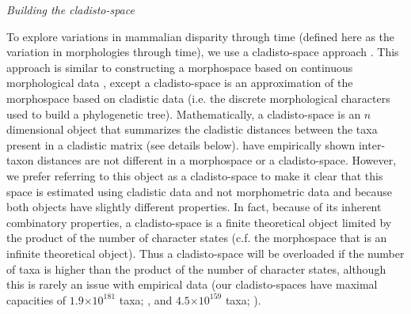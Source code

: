 \documentclass[12pt,letterpaper]{article}
\renewcommand{\subsection}[1]{%
\bigskip
\begin{center}
\begin{large}
\normalfont\itshape #1
\end{large}
\end{center}}
\begin{document}
\subsection{Building the cladisto-space}
To explore variations in mammalian disparity through time (defined here as the variation in morphologies through time), we use a cladisto-space approach \citep[e.g.][]{Foote01071994,Foote29111996,Wesley-Hunt2005,Brusatte12092008,friedmanexplosive2010,toljagictriassic-jurassic2013,Hughes20082013}.
This approach is similar to constructing a morphospace based on continuous morphological data \citep[e.g.][]{friedmanexplosive2010}, except a cladisto-space is an approximation of the morphospace based on cladistic data (i.e. the discrete morphological characters used to build a phylogenetic tree).
Mathematically, a cladisto-space is an $n$ dimensional object that summarizes the cladistic distances between the taxa present in a cladistic matrix (see details below).
\cite{hetherington2015cladistic} have empirically shown inter-taxon distances are not different in a morphospace or a cladisto-space.
However, we prefer referring to this object as a cladisto-space to make it clear that this space is estimated using cladistic data and not morphometric data and because both objects have slightly different properties.
In fact, because of its inherent combinatory properties, a cladisto-space is a finite theoretical object limited by the product of the number of character states (c.f. the morphospace that is an infinite theoretical object). %
Thus a cladisto-space will be overloaded if the number of taxa is higher than the product of the number of character states, although this is rarely an issue with empirical data (our cladisto-spaces have maximal capacities of $1.9$$\times$$10^{181}$ taxa; \citealp{Slater2012MEE}, and $4.5$$\times$$10^{159}$ taxa; \citealp{beckancient2014}). %
\end{document}
